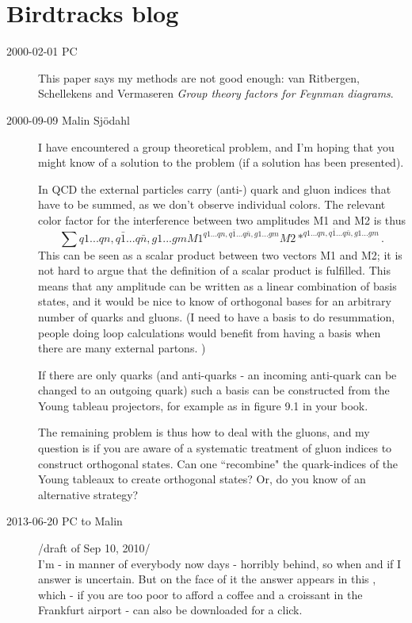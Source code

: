 \section{Birdtracks blog}
\label{s-birdtrBlog}

\begin{description}

\item[2000-02-01 PC]
This paper says my methods are not good enough:
van Ritbergen, Schellekens and Vermaseren
{\em Group theory factors for {Feynman} diagrams}.

\item[2000-09-09 Malin Sj{\"o}dahl]
I have encountered a group theoretical problem, and I'm hoping that you might
know of a solution to the problem (if a solution has been presented).

In QCD the external particles carry (anti-) quark and gluon indices that have
to be summed, as we don't observe individual colors. The relevant color
factor for the interference between two amplitudes M1 and M2 is thus
\[
\sum{q1...qn, q\bar{1}...q\bar{n},g1...gm}
      M1^{q1...qn, q\bar{1}...q\bar{n},g1...gm}
      M2*^{q1...qn, q\bar{1}...q\bar{n},g1...gm}.
\]
This can be seen as a scalar product between two vectors M1 and M2; it is not
hard to argue that the definition of a scalar product is fulfilled. This
means that any amplitude can be written as a linear combination of basis
states, and it would be nice to know of orthogonal bases for an arbitrary
number of quarks and gluons. (I need to have a basis to do resummation,
people doing loop calculations would benefit from having a basis when there
are many external partons. )

If there are only quarks (and anti-quarks - an incoming anti-quark can be
changed to an outgoing quark) such a basis can be constructed from the Young
tableau projectors, for example as in figure 9.1 in your book.

The remaining problem is thus how to deal with the gluons, and my question is
if you are aware of a systematic treatment of gluon indices to construct
orthogonal states. Can one ``recombine" the quark-indices of the Young
tableaux to create orthogonal states? Or, do you know of an alternative
strategy?

\item[2013-06-20 PC to Malin]

                           /draft of Sep 10, 2010/\\
I'm - in manner of everybody now days - horribly behind, so when and if I
answer is uncertain. But on the face of it the answer appears in this
, which - if you are too poor to
afford a coffee and a croissant in the Frankfurt airport - can also be
downloaded for a click.


\end{description}
